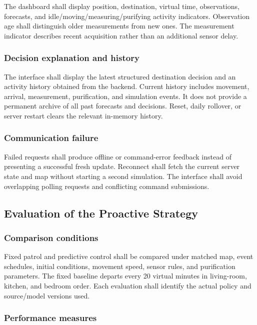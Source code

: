 \documentclass[conference]{IEEEtran}
\begin{document}
The dashboard shall display position, destination, virtual time, observations, forecasts, and idle/moving/measuring/purifying activity indicators. Observation age shall distinguish older measurements from new ones. The measurement indicator describes recent acquisition rather than an additional sensor delay.

\subsubsection{Decision explanation and history}

The interface shall display the latest structured destination decision and an activity history obtained from the backend. Current history includes movement, arrival, measurement, purification, and simulation events. It does not provide a permanent archive of all past forecasts and decisions. Reset, daily rollover, or server restart clears the relevant in-memory history.

\subsubsection{Communication failure}

Failed requests shall produce offline or command-error feedback instead of presenting a successful fresh update. Reconnect shall fetch the current server state and map without starting a second simulation. The interface shall avoid overlapping polling requests and conflicting command submissions.

\subsection{Evaluation of the Proactive Strategy}

\subsubsection{Comparison conditions}

Fixed patrol and predictive control shall be compared under matched map, event schedules, initial conditions, movement speed, sensor rules, and purification parameters. The fixed baseline departs every 20 virtual minutes in living-room, kitchen, and bedroom order. Each evaluation shall identify the actual policy and source/model versions used.

\subsubsection{Performance measures}
\end{document}
